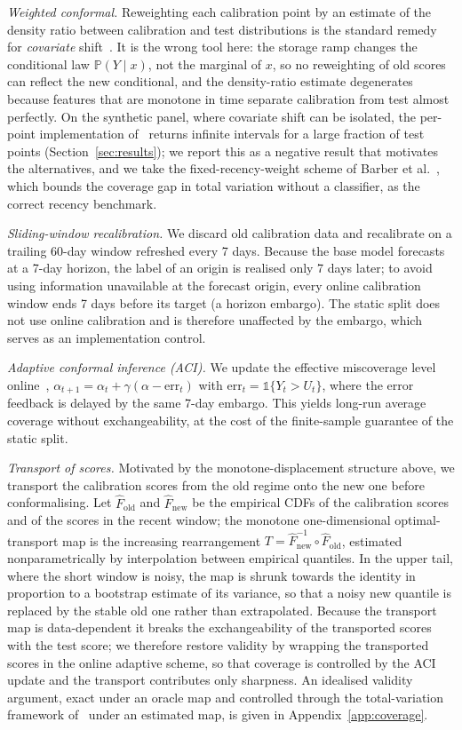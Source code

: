 \documentclass[preprint,3p,times]{elsarticle}
\begin{document}
\emph{Weighted conformal.} Reweighting each calibration point by an estimate of the density ratio between calibration and test distributions is the standard remedy for \emph{covariate} shift~\cite{tibshirani2019}. It is the wrong tool here: the storage ramp changes the conditional law $\mathbb{P}(Y\mid x)$, not the marginal of $x$, so no reweighting of old scores can reflect the new conditional, and the density-ratio estimate degenerates because features that are monotone in time separate calibration from test almost perfectly. On the synthetic panel, where covariate shift can be isolated, the per-point implementation of~\cite{tibshirani2019} returns infinite intervals for a large fraction of test points (Section~\ref{sec:results}); we report this as a negative result that motivates the alternatives, and we take the fixed-recency-weight scheme of Barber et al.~\cite{barber2023}, which bounds the coverage gap in total variation without a classifier, as the correct recency benchmark.

\emph{Sliding-window recalibration.} We discard old calibration data and recalibrate on a trailing 60-day window refreshed every 7 days. Because the base model forecasts at a 7-day horizon, the label of an origin is realised only 7 days later; to avoid using information unavailable at the forecast origin, every online calibration window ends 7 days before its target (a horizon embargo). The static split does not use online calibration and is therefore unaffected by the embargo, which serves as an implementation control.

\emph{Adaptive conformal inference (ACI).} We update the effective miscoverage level online~\cite{gibbs2021}, $\alpha_{t+1}=\alpha_t+\gamma(\alpha-\mathrm{err}_t)$ with $\mathrm{err}_t=\mathbb{1}\{Y_t>U_t\}$, where the error feedback is delayed by the same 7-day embargo. This yields long-run average coverage without exchangeability, at the cost of the finite-sample guarantee of the static split.

\emph{Transport of scores.} Motivated by the monotone-displacement structure above, we transport the calibration scores from the old regime onto the new one before conformalising. Let $\hat F_{\mathrm{old}}$ and $\hat F_{\mathrm{new}}$ be the empirical CDFs of the calibration scores and of the scores in the recent window; the monotone one-dimensional optimal-transport map is the increasing rearrangement $T=\hat F_{\mathrm{new}}^{-1}\circ\hat F_{\mathrm{old}}$, estimated nonparametrically by interpolation between empirical quantiles. In the upper tail, where the short window is noisy, the map is shrunk towards the identity in proportion to a bootstrap estimate of its variance, so that a noisy new quantile is replaced by the stable old one rather than extrapolated. Because the transport map is data-dependent it breaks the exchangeability of the transported scores with the test score; we therefore restore validity by wrapping the transported scores in the online adaptive scheme, so that coverage is controlled by the ACI update and the transport contributes only sharpness. An idealised validity argument, exact under an oracle map and controlled through the total-variation framework of~\cite{barber2023} under an estimated map, is given in Appendix~\ref{app:coverage}.
\end{document}
